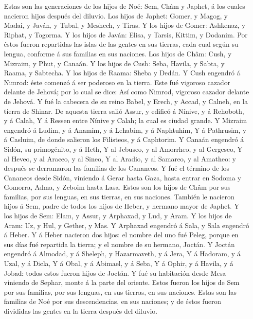  Estas son las generaciones de los hijos de Noé: Sem, Châm y
Japhet, á los cuales nacieron hijos después del diluvio. 
Los hijos de Japhet: Gomer, y Magog, y Madai, y Javán, y Tubal, y
Meshech, y Tiras.  Y los hijos de Gomer: Ashkenaz, y Riphat,
y Togorma.  Y los hijos de Javán: Elisa, y Tarsis, Kittim, y
Dodanim.  Por éstos fueron repartidas las islas de las
gentes en sus tierras, cada cual según su lengua, conforme á sus
familias en sus naciones.  Los hijos de Châm: Cush, y
Mizraim, y Phut, y Canaán.  Y los hijos de Cush: Seba,
Havila, y Sabta, y Raama, y Sabtecha. Y los hijos de Raama: Sheba y
Dedán.  Y Cush engendró á Nimrod: éste comenzó á ser
poderoso en la tierra.  Este fué vigoroso cazador delante de
Jehová; por lo cual se dice: Así como Nimrod, vigoroso cazador delante
de Jehová.  Y fué la cabecera de su reino Babel, y Erech, y
Accad, y Calneh, en la tierra de Shinar.  De aquesta tierra
salió Assur, y edificó á Nínive, y á Rehoboth, y á Calah, 
Y á Ressen entre Nínive y Calah; la cual es ciudad grande. 
Y Mizraim engendró á Ludim, y á Anamim, y á Lehabim, y á Naphtuhim,
 Y á Pathrusim, y á Casluim, de donde salieron los
Filisteos, y á Caphtorim.  Y Canaán engendró á Sidón, su
primogénito, y á Heth,  Y al Jebuseo, y al Amorrheo, y al
Gergeseo,  Y al Heveo, y al Araceo, y al Sineo,
 Y al Aradio, y al Samareo, y al Amatheo: y después se
derramaron las familias de los Cananeos.  Y fué el término
de los Cananeos desde Sidón, viniendo á Gerar hasta Gaza, hasta entrar
en Sodoma y Gomorra, Adma, y Zeboim hasta Lasa.  Estos son
los hijos de Châm por sus familias, por sus lenguas, en sus tierras, en
sus naciones.  También le nacieron hijos á Sem, padre de
todos los hijos de Heber, y hermano mayor de Japhet.  Y los
hijos de Sem: Elam, y Assur, y Arphaxad, y Lud, y Aram.  Y
los hijos de Aram: Uz, y Hul, y Gether, y Mas.  Y Arphaxad
engendró á Sala, y Sala engendró á Heber.  Y á Heber
nacieron dos hijos: el nombre del uno fué Peleg, porque en sus días fué
repartida la tierra; y el nombre de su hermano, Joctán.  Y
Joctán engendró á Almodad, y á Sheleph, y Hazarmaveth, y á Jera,
 Y á Hadoram, y á Uzal, y á Dicla,  Y á Obal,
y á Abimael, y á Seba,  Y á Ophir, y á Havila, y á Jobad:
todos estos fueron hijos de Joctán.  Y fué su habitación
desde Mesa viniendo de Sephar, monte á la parte del oriente.
 Estos fueron los hijos de Sem por sus familias, por sus
lenguas, en sus tierras, en sus naciones.  Estas son las
familias de Noé por sus descendencias, en sus naciones; y de éstos
fueron divididas las gentes en la tierra después del diluvio.

